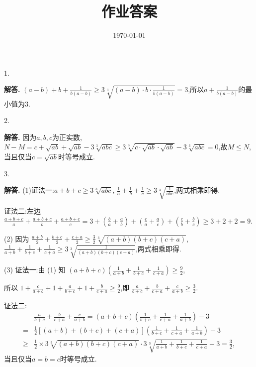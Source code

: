 \documentclass[12pt,a4paper,oneside]{ctexart}
\title{\textbf{作业答案}}
\date{\today}
\newcounter{problemname}
\newenvironment{problem}{\stepcounter{problemname}\par\noindent\textbf{题目\arabic{problemname}. }}{\\\par}
\newenvironment{solution}{\par\noindent\textbf{解答. }}{\\\par}
\newenvironment{note}{\par\noindent\textbf{题目\arabic{problemname}的注记. }}{\\\par}
\begin{document}
\maketitle



1.\begin{solution}
    $ (a-b)+b+\frac{1}{b(a-b)}\geqslant 3\sqrt[3]{(a-b)\cdot b\cdot \frac{1}{b(a-b)}}=3 $,所以$ a+\frac{1}{b(a-b)} $的最小值为$ 3 $.
\end{solution}

2.\begin{solution}
    因为$ a,b,c $为正实数,$ N-M=c+\sqrt{ab}+\sqrt{ab}-3\sqrt[3]{abc}\geqslant 3\sqrt[3]{c\cdot \sqrt{ab}\cdot \sqrt{ab}}-3\sqrt[3]{abc}=0 $,故$ M\leqslant N $,当且仅当$ c=\sqrt{ab} $时等号成立.
\end{solution}

3.\begin{solution}
    (1)证法一:\( a+b+c \geqslant 3 \sqrt[3]{abc} \), \( \frac{1}{a}+\frac{1}{b}+\frac{1}{c} \geqslant 3 \sqrt[3]{\frac{1}{abc}} \),两式相乘即得.

    证法二:左边 \( \frac{a+b+c}{a}+\frac{a+b+c}{b}+\frac{a+b+c}{c}=3+(\frac{b}{a}+\frac{a}{b})+(\frac{c}{a}+\frac{a}{c})+(\frac{c}{b}+\frac{b}{c})\geqslant 3+2+2=9 \).

    (2) 因为 \( \frac{a+b}{2}+\frac{b+c}{2}+\frac{c+a}{2}\geqslant \frac{3}{2} \sqrt[3]{(a+b)(b+c)(c+a)} \), \( \frac{1}{a+b}+\frac{1}{b+c}+\frac{1}{c+a}\geqslant 3 \sqrt[3]{\frac{1}{(a+b)(b+c)(c+a)}} \),两式相乘即得.

    (3) 证法一:由 (1) 知 \( (a+b+c)\left(\frac{1}{a+b}+\frac{1}{b+c}+\frac{1}{c+a}\right)\geqslant \frac{9}{2} \),

    所以 \( 1+\frac{c}{a+b}+1+\frac{a}{b+c}+1+\frac{b}{c+a}\geqslant \frac{9}{2} \),即 \( \frac{a}{b+c}+\frac{b}{c+a}+\frac{c}{a+b}\geqslant \frac{3}{2} \).

    证法二:\begin{align*}
        & \frac{a}{b+c}+\frac{b}{c+a}+\frac{c}{a+b}=(a+b+c)\left(\frac{1}{b+c}+\frac{1}{c+a}+\frac{1}{a+b}\right)-3 \\
    =&\frac{1}{2}[(a+b)+(b+c)+(c+a)]\left(\frac{1}{b+c}+\frac{1}{c+a}+\frac{1}{a+b}\right)-3\\
    \geqslant & \frac{1}{2} \times 3\sqrt[3]{(a+b)(b+c)(c+a)} \cdot 3\sqrt[3]{\frac{1}{a+b}+\frac{1}{b+c}+\frac{1}{c+a}}-3=\frac{3}{2},
    \end{align*}
    当且仅当$ a=b=c $时等号成立.
\end{solution}
\end{document}
